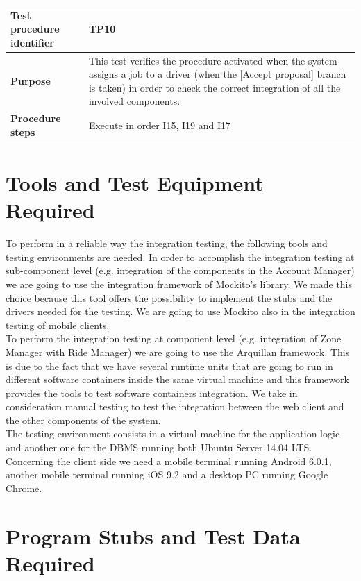 \documentclass[a4paper,11pt]{report} %
\begin{document}
				\begin{center}
					\begin{tabular}{| l | p{9.5cm} |}\hline
						\textbf{Test procedure identifier} & TP10\\\hline
						\textbf{Purpose} & This test verifies the procedure activated when the system assigns a job to a driver (when the [Accept proposal] branch is taken) in order to check the correct integration of all the involved components.\\\hline
						\textbf{Procedure steps} & Execute in order I15, I19 and I17 \\\hline
					\end{tabular}
				\end{center}																																					
									

	
	\section{Tools and Test Equipment Required}
		To perform in a reliable way the integration testing, the following tools and testing environments are needed.
In order to accomplish the integration testing at sub-component level (e.g. integration of the components in the Account Manager) we are going to use the integration framework of Mockito's library. We made this choice because this tool offers the possibility to implement the stubs and the drivers needed for the testing. We are going to use Mockito also in the integration testing of mobile clients.\\
To perform the integration testing at component level (e.g. integration of Zone Manager with Ride Manager) we are going to use the Arquillan framework. This is due to the fact that we have several runtime units that are going to run in different software containers inside the same virtual machine and this framework provides the tools to test software containers integration.
We take in consideration manual testing to test the integration between the web client and the other components of the system.\\
The testing environment consists in a virtual machine for the application logic and another one for the DBMS running both Ubuntu Server 14.04 LTS. Concerning the client side we need a mobile terminal running Android  6.0.1, another mobile terminal running iOS 9.2 and a desktop PC running Google Chrome.

	
	
	\section{Program Stubs and Test Data Required}
	
\end{document}
